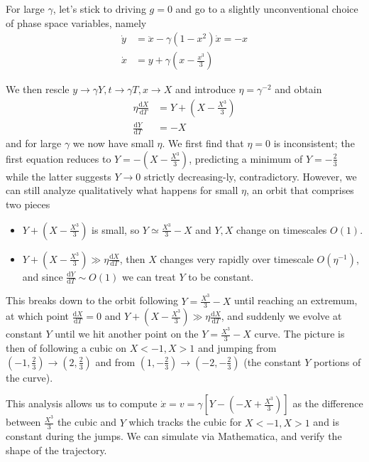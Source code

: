 \documentclass[10pt]{article}
\newcommand{\rd}[2]{\frac{\mathrm{d}#1}{\mathrm{d}#2}}
\begin{document}
For large $\gamma$, let's stick to driving $g=0$ and go to a slightly unconventional choice of phase space variables, namely
\begin{align}
    \dot{y} &= \ddot{x} - \gamma(1-x^2)\dot{x} = -x\\
    \dot{x} &= y + \gamma\left( x - \frac{x^3}{3} \right)
\end{align}

We then rescle $y \to \gamma Y, t \to \gamma T, x \to X$ and introduce $\eta = \gamma^{-2}$ and obtain
\begin{align}
    \eta \rd{X}{T} &= Y + \left( X - \frac{X^3}{3} \right)\\
    \rd{Y}{T} &= -X
\end{align}
and for large $\gamma$ we now have small $\eta$. We first find that $\eta = 0$ is inconsistent; the first equation reduces to $Y = -\left( X - \frac{X^3}{3} \right)$, predicting a minimum of $Y = -\frac{2}{3}$ while the latter suggests $Y \to 0$ strictly decreasing-ly, contradictory. However, we can still analyze qualitatively what happens for small $\eta$, an orbit that comprises two pieces
\begin{itemize}
    \item $Y + \left( X - \frac{X^3}{3} \right)$ is small, so $Y \simeq \frac{X^3}{3} - X$ and $Y, X$ change on timescales $O(1)$.
    \item $Y + \left( X - \frac{X^3}{3} \right) \gg \eta\rd{X}{T}$, then $X$ changes very rapidly over timescale $O(\eta^{-1})$, and since $\rd{Y}{T} \sim O(1)$ we can treat $Y$ to be constant.
\end{itemize}

This breaks down to the orbit following $Y = \frac{X^3}{3} - X$ until reaching an extremum, at which point $\rd{X}{T} = 0$ and $Y + \left( X - \frac{X^3}{3} \right) \gg \eta \rd{X}{T}$, and suddenly we evolve at constant $Y$ until we hit another point on the $Y = \frac{X^3}{3} - X$ curve. The picture is then of following a cubic on $X < -1, X > 1$ and jumping from $\left(-1, \frac{2}{3}\right) \to \left( 2, \frac{2}{3} \right)$ and from $\left( 1, -\frac{2}{3} \right)\to \left( -2, -\frac{2}{3} \right)$ (the constant $Y$ portions of the curve).

This analysis allows us to compute $\dot{x} = v = \gamma\left[ Y - \left( -X + \frac{X^3}{3} \right) \right]$ as the difference between $\frac{X^3}{3}$ the cubic and $Y$ which tracks the cubic for $X < -1, X > 1$ and is constant during the jumps. We can simulate via Mathematica, and verify the shape of the trajectory.
\end{document}

